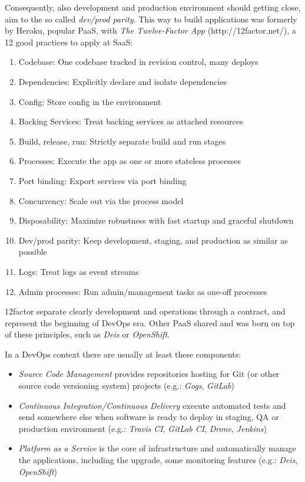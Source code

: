Consequently, also development and production environment should getting close, aim to the so called \textit{dev/prod parity}. This way to build applications was formerly by Heroku, popular PaaS, with \textit{The
Twelve-Factor App} (http://12factor.net/), a 12 good practices to apply
at SaaS:

\begin{enumerate}
\item Codebase:  One codebase tracked in revision control, many deploys
\item Dependencies:  Explicitly declare and isolate dependencies
\item Config: Store config in the environment
\item Backing Services:  Treat backing services as attached resources
\item Build, release, run:  Strictly separate build and run stages
\item Processes:  Execute the app as one or more stateless processes
\item Port binding:  Export services via port binding
\item Concurrency:  Scale out via the process model
\item Disposability:  Maximize robustness with fast startup and graceful shutdown
\item Dev/prod parity:  Keep development, staging, and production as similar as possible
\item Logs:  Treat logs as event streams
\item Admin processes:  Run admin/management tasks as one-off processes
\end{enumerate}

12factor separate clearly development and operations through a contract,
and represent the beginning of DevOps era. Other PaaS shared and was
born on top of these principles, such as \textit{Deis} or
\textit{OpenShift}.

In a DevOps context there are usually at least these components:
\begin{itemize}

\item
  \textit{Source Code Management} provides repositories hosting for Git
  (or other source code versioning system) projects (e.g.: \textit{Gogs},
  \textit{GitLab})
\item
  \textit{Continuous Integration/Continuous Delivery} execute automated
  tests and send somewhere else when software is ready to deploy in
  staging, QA or production environment (e.g.: \textit{Travis CI},
  \textit{GitLab CI}, \textit{Drone}, \textit{Jenkins})
\item
  \textit{Platform as a Service} is the core of infrastructure and
  automatically manage the applications, including the upgrade, some
  monitoring features (e.g.: \textit{Deis}, \textit{OpenShift})
\end{itemize}

